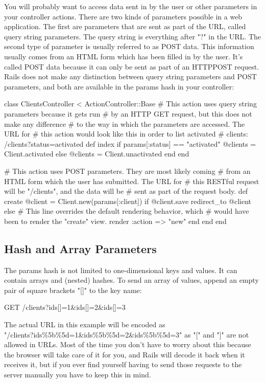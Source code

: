 \documentclass[10pt]{book}
\newenvironment{code}{%
  \scriptsize
    \verbatim
}{%
    \endverbatim
    \newline
}
\begin{document}
You will probably want to access data sent in by the user or other  parameters in your controller actions. There are two kinds of parameters  possible in a web application. The first are parameters that are sent  as part of the URL, called query string parameters. The query string is everything after "?" in the URL. The second type of parameter is usually referred to as POST data. This information usually comes from an HTML form which has been filled in by the user. It’s called POST data because it can only be sent as part of an HTTPPOST request. Rails does not make any distinction between query string parameters and POST parameters, and both are available in the params hash in your controller:
\begin{code}
class ClientsController < ActionController::Base
  # This action uses query string parameters because it gets run
  # by an HTTP GET request, but this does not make any difference
  # to the way in which the parameters are accessed. The URL for
  # this action would look like this in order to list activated
  # clients: /clients?status=activated
  def index
    if params[:status] == "activated"
      @clients = Client.activated
    else
      @clients = Client.unactivated
    end
  end
 
  # This action uses POST parameters. They are most likely coming
  # from an HTML form which the user has submitted. The URL for
  # this RESTful request will be "/clients", and the data will be
  # sent as part of the request body.
  def create
    @client = Client.new(params[:client])
    if @client.save
      redirect_to @client
    else
      # This line overrides the default rendering behavior, which
      # would have been to render the "create" view.
      render :action => "new"
    end
  end
end
\end{code}

\subsection{ Hash and Array Parameters}

The params hash is not limited to one-dimensional keys and  values. It can contain arrays and (nested) hashes. To send an array of  values, append an empty pair of square brackets "[]" to the key name:
\begin{code}
GET /clients?ids[]=1&ids[]=2&ids[]=3
\end{code}

The actual URL in this  example will be encoded as \\ "/clients?ids\%5b\%5d=1\&ids\%5b\%5d=2\&ids\%5b\%5d=3" as "[" and "]"  are not allowed in URLs. Most of the time you don’t have to worry about  this because the browser will take care of it for you, and Rails will  decode it back when it receives it, but if you ever find yourself having  to send those requests to the server manually you have to keep this in  mind.
\end{document}

